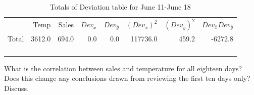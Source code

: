 \documentclass[addpoints,12pt]{exam}
\newcommand{\dev}[1] {Dev_{\bar{#1}}}
\begin{document}
\begin{questions}
\begin{parts}
\begin{table}[ht]
\centering
\begin{tabular}{rrrrrrrr}
  \toprule
 & Temp & Sales & $\dev{x}$ & $\dev{y}$ & $(\dev{x})^2$ & $(\dev{y})^2$ & $\dev{x}\dev{y}$ \\ 
Total & 3612.0& 694.0&  0.0&  0.0& 117736.0& 459.2& -6272.8  \\ 
\rowcolor[gray]{0.95}& &  &   & & & & \\
\rowcolor[gray]{0.95}& &  &   & & & & \\
\rowcolor[gray]{0.95}& &  &   & & & & \\
\rowcolor[gray]{0.95}& &  &   & & & & \\
\end{tabular}
\caption{Totals of Deviation table for June 11-June 18} 
\end{table}
\vspace{5mm}
\bonuspart[10]
What is the correlation between sales and temperature for all eighteen days?
\vspace{2cm}
\bonuspart[10]
Does this change any conclusions drawn from reviewing the first ten days only? Discuss.
\end{parts}

\end{questions}
\end{document}
